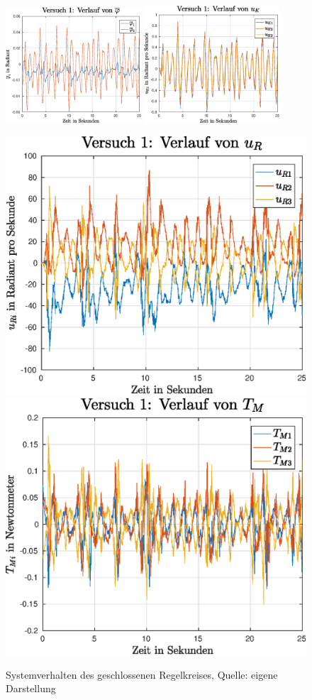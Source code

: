 \begin{figure}[h!]
\centering
\includegraphics[width=0.45\textwidth]{img/exp1_phi.eps}
\includegraphics[width=0.45\textwidth]{img/exp1_uk.eps}
\vspace{0.5cm}

\includegraphics[width=0.45\linewidth]{img/exp1_ur.eps}
\includegraphics[width=0.45\linewidth]{img/exp1_tm.eps}
\caption{Systemverhalten des geschlossenen Regelkreises, Quelle: eigene Darstellung}
\end{figure}
